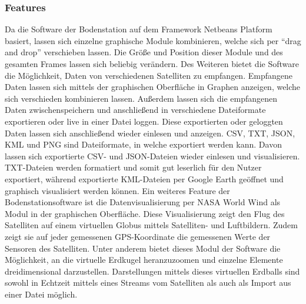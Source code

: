 \subsubsection{Features}
Da die Software der Bodenstation auf dem Framework Netbeans Platform basiert, lassen sich einzelne graphische Module kombinieren, welche sich per ``drag and drop'' verschieben lassen. Die Größe und Position dieser Module und des gesamten Frames lassen sich beliebig verändern. Des Weiteren bietet die Software die Möglichkeit, Daten von verschiedenen Satelliten zu empfangen. Empfangene Daten lassen sich mittels der graphischen Oberfläche in Graphen anzeigen, welche sich verschieden kombinieren lassen. Außerdem lassen sich die empfangenen Daten zwischenspeichern und anschließend in verschiedene Dateiformate exportieren oder live in einer Datei loggen. Diese exportierten oder geloggten Daten lassen sich anschließend wieder einlesen und anzeigen. CSV, TXT, JSON, KML und PNG sind Dateiformate, in welche exportiert werden kann. Davon lassen sich exportierte CSV- und JSON-Dateien wieder einlesen und visualisieren. TXT-Dateien werden formatiert und somit gut leserlich für den Nutzer exportiert, während exportierte KML-Dateien per Google Earth geöffnet und graphisch visualisiert werden können. Ein weiteres Feature der Bodenstationsoftware ist die Datenvisualisierung per NASA World Wind als Modul in der graphischen Oberfläche. Diese Visualisierung zeigt den Flug des Satelliten auf einem virtuellen Globus mittels Satelliten- und Luftbildern. Zudem zeigt sie auf jeder gemessenen GPS-Koordinate die gemessenen Werte der Sensoren des Satelliten. Unter anderem bietet dieses Modul der Software die Möglichkeit, an die virtuelle Erdkugel heranzuzoomen und einzelne Elemente dreidimensional darzustellen. Darstellungen mittels dieses virtuellen Erdballs sind sowohl in Echtzeit mittels eines Streams vom Satelliten als auch als Import aus einer Datei möglich.
